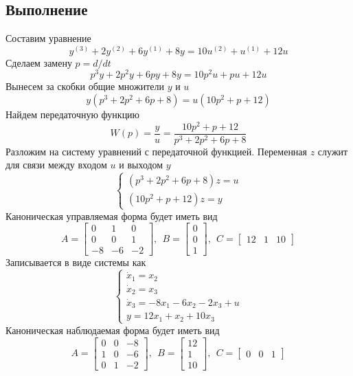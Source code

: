 \documentclass[a4paper, 12pt]{article}
\begin{document}
    \subsection{Выполнение}
    Составим уравнение
    $$y^{(3)}+2y^{(2)}+6y^{(1)}+8y=10u^{(2)}+u^{(1)}+12u$$
    Сделаем замену $p=d/dt$
    $$p^3y+2p^2y+6py+8y=10p^2u+pu+12u$$
    Вынесем за скобки общие множители $y$ и $u$
    $$y(p^3+2p^2+6p+8)=u(10p^2+p+12)$$
    Найдем передаточную функцию
    $$W(p)=\dfrac{y}{u}=\dfrac{10p^2+p+12}{p^3+2p^2+6p+8}$$
    Разложим на систему уравнений с передаточной функцией. Переменная $z$ служит для связи между входом $u$ и выходом $y$
    $$
    \begin{cases}
        (p^3+2p^2+6p+8)z=u\\
        (10p^2+p+12)z=y
    \end{cases}
    $$
    Каноническая управляемая форма будет иметь вид
    $$
    A=
    \begin{bmatrix}
        0 & 1 & 0\\
        0 & 0 & 1\\
        -8 & -6 & -2
    \end{bmatrix},\ \
    B=
    \begin{bmatrix}
        0\\
        0\\
        1
    \end{bmatrix},\ \
    C=
    \begin{bmatrix}
        12 & 1 & 10
    \end{bmatrix}
    $$
    Записывается в виде системы как
    $$
    \begin{cases}
        \dot{x}_1=x_2\\
        \dot{x}_2=x_3\\
        \dot{x}_3=-8x_1-6x_2-2x_3+u\\
        y=12x_1+x_2+10x_3
    \end{cases}
    $$
    Каноническая наблюдаемая форма будет иметь вид
    $$
    A=
    \begin{bmatrix}
        0 & 0 & -8\\
        1 & 0 & -6\\
        0 & 1 & -2
    \end{bmatrix},\ \
    B=
    \begin{bmatrix}
        12\\
        1\\
        10
    \end{bmatrix},\ \
    C=
    \begin{bmatrix}
        0 & 0 & 1
    \end{bmatrix}
    $$
\end{document}
